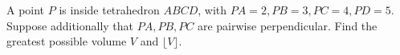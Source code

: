 A point $P$ is inside tetrahedron $ABCD$, with $PA=2,PB=3,PC=4,PD=5$. Suppose additionally that $PA,PB,PC$ are pairwise perpendicular. Find the greatest possible volume $V$ and $\lfloor V\rfloor$.
